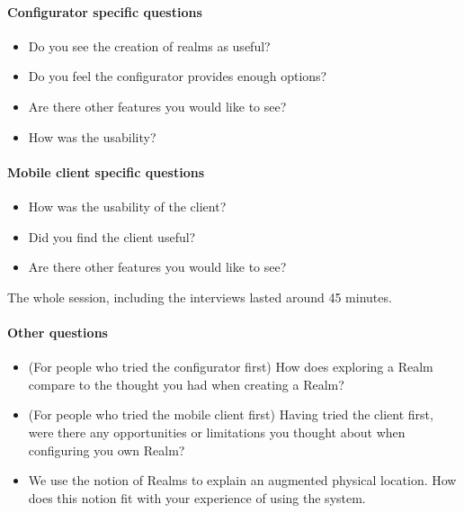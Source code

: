 \paragraph{Configurator specific questions} %
\label{par:configurator_specific_questiosn}
\begin{itemize}
	\item Do you see the creation of realms as useful?
	\item Do you feel the configurator provides enough options?
	\item Are there other features you would like to see?
	\item How was the usability?
\end{itemize}

\paragraph{Mobile client specific questions} %
\label{par:mobile_client_specific_questions}
\begin{itemize}
	\item How was the usability of the client?
	\item Did you find the client useful?
	\item Are there other features you would like to see?
\end{itemize}

The whole session, including the interviews lasted around 45 minutes.

\paragraph{Other questions} %
\label{par:other_questions}
\begin{itemize}
	\item (For people who tried the configurator first) How does exploring a Realm compare to the thought you had when creating a Realm?
	\item (For people who tried the mobile client first) Having tried the client first, were there any opportunities or limitations you thought about when configuring you own Realm?
	\item We use the notion of Realms to explain an augmented physical location. How does this notion fit with your experience of using the system.
\end{itemize}

